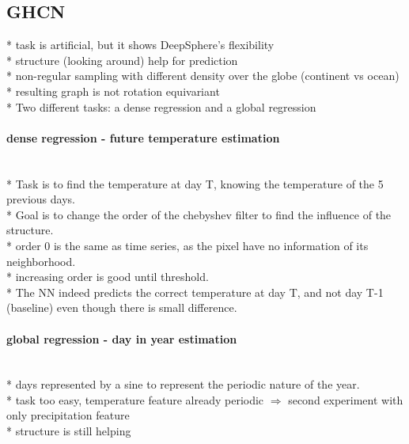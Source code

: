 \documentclass{article} %
\begin{document}

\subsection{GHCN}

* task is artificial, but it shows DeepSphere's flexibility\\
* structure (looking around) help for prediction\\

* non-regular sampling with different density over the globe (continent vs ocean)\\
* resulting graph is not rotation equivariant\\
* Two different tasks: a dense regression and a global regression\\

\paragraph*{dense regression - future temperature estimation}~\\
* Task is to find the temperature at day T, knowing the temperature of the 5 previous days.\\
* Goal is to change the order of the chebyshev filter to find the influence of the structure.\\
* order 0 is the same as time series, as the pixel have no information of its neighborhood.\\
* increasing order is good until threshold.\\
* The NN indeed predicts the correct temperature at day T, and not day T-1 (baseline) even though there is small difference.\\



\paragraph*{global regression - day in year estimation}~\\
* days represented by a sine to represent the periodic nature of the year.\\
* task too easy, temperature feature already periodic $\Rightarrow$ second experiment with only precipitation feature\\
* structure is still helping\\
\end{document}
